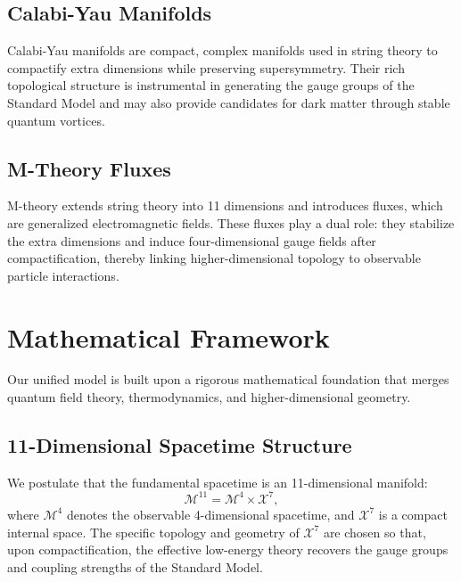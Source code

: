 \documentclass[12pt, a4paper]{article}
\begin{document}
\subsection{Calabi-Yau Manifolds}
Calabi-Yau manifolds are compact, complex manifolds used in string theory to compactify extra dimensions while preserving supersymmetry. Their rich topological structure is instrumental in generating the gauge groups of the Standard Model and may also provide candidates for dark matter through stable quantum vortices.

\subsection{M-Theory Fluxes}
M-theory extends string theory into 11 dimensions and introduces fluxes, which are generalized electromagnetic fields. These fluxes play a dual role: they stabilize the extra dimensions and induce four-dimensional gauge fields after compactification, thereby linking higher-dimensional topology to observable particle interactions.

\section{Mathematical Framework}
Our unified model is built upon a rigorous mathematical foundation that merges quantum field theory, thermodynamics, and higher-dimensional geometry.

\subsection{11-Dimensional Spacetime Structure}
We postulate that the fundamental spacetime is an 11-dimensional manifold:
\begin{equation}
    \mathcal{M}^{11} = \mathcal{M}^4 \times \mathcal{X}^7,
\end{equation}
where \(\mathcal{M}^4\) denotes the observable 4-dimensional spacetime, and \(\mathcal{X}^7\) is a compact internal space. The specific topology and geometry of \(\mathcal{X}^7\) are chosen so that, upon compactification, the effective low-energy theory recovers the gauge groups and coupling strengths of the Standard Model.
\end{document}
